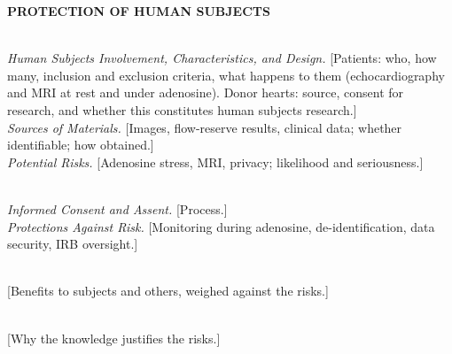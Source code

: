 \documentclass[11pt]{article}
\begin{document}
\textbf{PROTECTION OF HUMAN SUBJECTS}

\\
\textit{Human Subjects Involvement, Characteristics, and Design.} [Patients: who, how many, inclusion and exclusion criteria, what happens to them (echocardiography and MRI at rest and under adenosine). Donor hearts: source, consent for research, and whether this constitutes human subjects research.]\\
\textit{Sources of Materials.} [Images, flow-reserve results, clinical data; whether identifiable; how obtained.]\\
\textit{Potential Risks.} [Adenosine stress, MRI, privacy; likelihood and seriousness.]

\\
\textit{Informed Consent and Assent.} [Process.]\\
\textit{Protections Against Risk.} [Monitoring during adenosine, de-identification, data security, IRB oversight.]

\\
{}[Benefits to subjects and others, weighed against the risks.]

\\
{}[Why the knowledge justifies the risks.]
\end{document}
